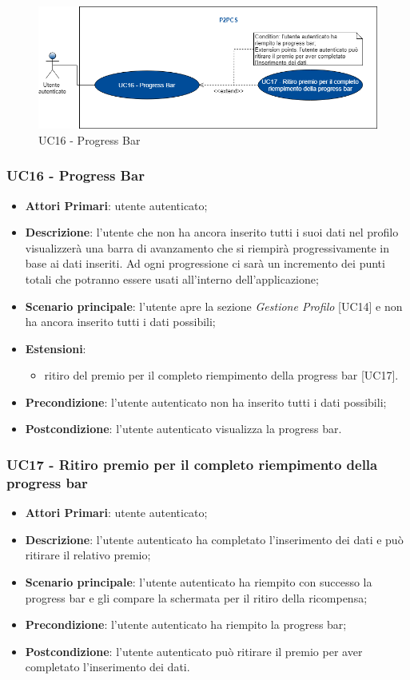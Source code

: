 \begin{figure}[h]
	\includegraphics[width=13cm]{res/images/Schemagenerale7.png}
	\centering
	\caption{UC16 - Progress Bar}
\end{figure}
\subsubsection{UC16 - Progress Bar}
\begin{itemize}
	\item \textbf{Attori Primari}: utente autenticato;
	\item \textbf{Descrizione}: l'utente che non ha ancora inserito tutti i suoi dati nel profilo visualizzerà una barra di avanzamento che si riempirà progressivamente in base ai dati inseriti. Ad ogni progressione ci sarà un incremento dei punti totali che potranno essere usati all'interno dell'applicazione;
	\item \textbf{Scenario principale}: l'utente apre la sezione \textit{Gestione Profilo} [UC14] e non ha ancora inserito tutti i dati possibili;
	\item \textbf{Estensioni}:
	\begin{itemize}
		\item ritiro del premio per il completo riempimento della progress bar [UC17].
	\end{itemize}
	\item \textbf{Precondizione}: l'utente autenticato non ha inserito tutti i dati possibili;
	\item \textbf{Postcondizione}: l'utente autenticato visualizza la progress bar.
\end{itemize}

\subsubsection{UC17 - Ritiro premio per il completo riempimento della progress bar}
\begin{itemize}
	\item \textbf{Attori Primari}: utente autenticato;
	\item \textbf{Descrizione}: l'utente autenticato ha completato l'inserimento dei dati e può ritirare il relativo premio;	
	\item \textbf{Scenario principale}: l'utente autenticato ha riempito con successo la progress bar e gli compare la schermata per il ritiro della ricompensa;
	\item \textbf{Precondizione}: l'utente autenticato ha riempito la progress bar;
	\item \textbf{Postcondizione}: l'utente autenticato può ritirare il premio per aver completato l'inserimento dei dati.
\end{itemize}
